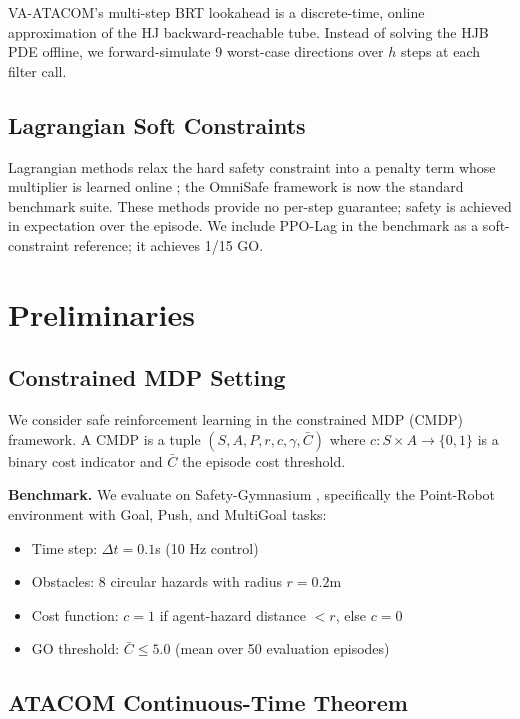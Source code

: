 \documentclass[letterpaper]{article}
\begin{document}
VA-ATACOM's multi-step BRT lookahead is a discrete-time, online approximation of the HJ backward-reachable tube. Instead of solving the HJB PDE offline, we forward-simulate 9 worst-case directions over $h$ steps at each filter call.

\subsection{Lagrangian Soft Constraints}

Lagrangian methods relax the hard safety constraint into a penalty term whose multiplier is learned online \cite{achiam2017,ray2019,tessler2018,yang2020,stooke2020}; the OmniSafe framework \cite{ji2024} is now the standard benchmark suite. These methods provide no per-step guarantee; safety is achieved in expectation over the episode. We include PPO-Lag in the benchmark as a soft-constraint reference; it achieves 1/15 GO.

\section{Preliminaries}

\subsection{Constrained MDP Setting}

We consider safe reinforcement learning in the constrained MDP (CMDP) framework. A CMDP is a tuple $(S, A, P, r, c, \gamma, \bar{C})$ where $c: S \times A \to \{0, 1\}$ is a binary cost indicator and $\bar{C}$ the episode cost threshold.

\textbf{Benchmark.} We evaluate on Safety-Gymnasium \cite{ji2023}, specifically the Point-Robot environment with Goal, Push, and MultiGoal tasks:
\begin{itemize}
\item Time step: $\Delta t = 0.1$s (10 Hz control)
\item Obstacles: 8 circular hazards with radius $r = 0.2$m
\item Cost function: $c = 1$ if agent-hazard distance $< r$, else $c = 0$
\item GO threshold: $\bar{C} \le 5.0$ (mean over 50 evaluation episodes)
\end{itemize}

\subsection{ATACOM Continuous-Time Theorem}
\end{document}

